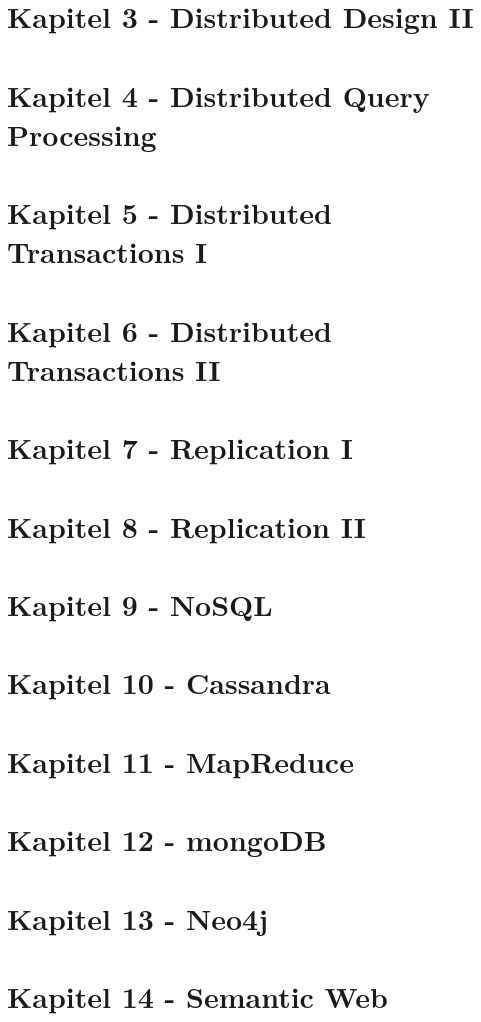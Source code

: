 \documentclass[a4paper,11pt]{article}
\begin{document}
\section{Kapitel 3 - Distributed Design II}
\section{Kapitel 4 - Distributed Query Processing}
\section{Kapitel 5 - Distributed Transactions I}
\section{Kapitel 6 - Distributed Transactions II}
\section{Kapitel 7 - Replication I}
\section{Kapitel 8 - Replication II}
\section{Kapitel 9 - NoSQL}
\section{Kapitel 10 - Cassandra}
\section{Kapitel 11 - MapReduce}
\section{Kapitel 12 - mongoDB}
\section{Kapitel 13 - Neo4j}
\section{Kapitel 14 - Semantic Web}
\end{document}
